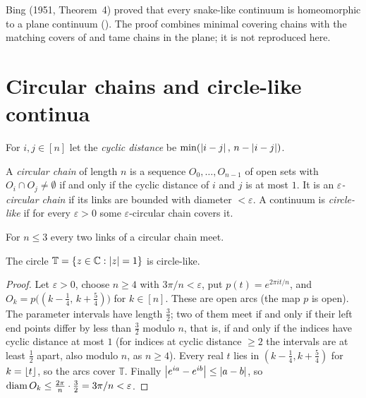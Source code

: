
\begin{remark}
Bing (1951, Theorem~4) proved that every snake-like continuum is homeomorphic to a plane continuum
(). The proof combines minimal covering chains with the matching covers of
 and tame chains in the plane; it is not reproduced here.
\end{remark}

\section{Circular chains and circle-like continua}

For $i,j\in[n]$ let the \emph{cyclic distance} be $\min(\left\lvert i-j\right\rvert,\,n-\left\lvert i-j\right\rvert)$.

\begin{definition}\label{def:circchain}
A \emph{circular chain} of length $n$ is a sequence $O_0,\dots,O_{n-1}$ of open sets with $O_i\cap
O_j\ne\emptyset$ if and only if the cyclic distance of $i$ and $j$ is at most $1$. It is an
\emph{$\varepsilon$-circular chain} if its links are bounded with diameter $<\varepsilon$. A continuum
is \emph{circle-like} if for every $\varepsilon>0$ some $\varepsilon$-circular chain covers it.
\end{definition}


For $n\le3$ every two links of a circular chain meet.

\begin{proposition}\label{prop:circle-circlelike}
The circle $\mathbb T=\left\{ z\in\mathbb C:\left\lvert z\right\rvert=1 \right\}$ is circle-like.
\end{proposition}

\begin{proof}
Let $\varepsilon>0$, choose $n\ge4$ with $3\pi/n<\varepsilon$, put $p(t)=e^{2\pi it/n}$, and
$O_k=p\bigl((k-\frac14,\,k+\frac54)\bigr)$ for $k\in[n]$. These are open arcs (the map $p$ is open). The
parameter intervals have length $\frac32$; two of them meet if and only if their left end points
differ by less than $\frac32$ modulo $n$, that is, if and only if the indices have cyclic distance at
most $1$ (for indices at cyclic distance $\ge2$ the intervals are at least $\frac12$ apart, also
modulo $n$, as $n\ge4$). Every real $t$ lies in $(k-\frac14,k+\frac54)$ for $k=\left\lfloor t\right\rfloor$, so the arcs
cover $\mathbb T$. Finally $\left\lvert e^{ia}-e^{ib}\right\rvert\le\left\lvert a-b\right\rvert$, so $\operatorname{diam} O_k\le\frac{2\pi}n\cdot\frac32=
3\pi/n<\varepsilon$.
\end{proof}

